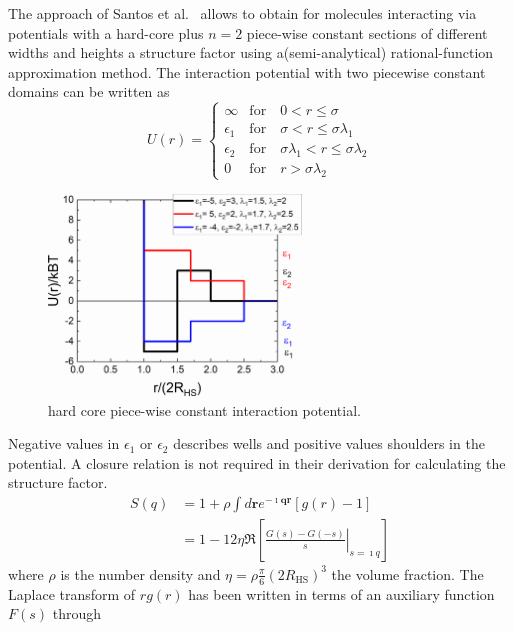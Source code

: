 The approach of Santos et al.\ \cite{Santos_2012,Santos_2013} allows to obtain for molecules interacting via potentials with a hard-core plus $n=2$ piece-wise constant sections of different widths and heights a structure factor using a(semi-analytical) rational-function approximation method. The interaction potential with two piecewise constant domains can be written as
\begin{equation}
U(r) =
 \begin{cases}
      \infty    & \text{for} \quad 0<r\leq\sigma \\
      \epsilon_1 & \text{for} \quad \sigma<r\leq\sigma\lambda_1 \\
      \epsilon_2 & \text{for} \quad \sigma\lambda_1<r\leq\sigma\lambda_2 \\
      0         & \text{for} \quad r>\sigma\lambda_2
   \end{cases}
\end{equation}
\begin{figure}[htb]
\begin{center}
\includegraphics[width=0.6\textwidth]{../images/structure_factor/piecewise_constant_HS/piecewise_constant_2.png}
\end{center}
\caption{hard core piece-wise constant interaction potential.}
\label{fig:Upiecewiseconstant}
\end{figure}
Negative values in $\epsilon_1$ or $\epsilon_2$ describes wells and positive values shoulders in the potential. A closure relation is not required in their derivation for calculating the structure factor.
\begin{align}
  S(q) &= 1+ \rho\int d\mathbf{r} e^{-\imath \mathbf{qr}}\left[g(r)-1\right] \\
       &= 1 - 12\eta\Re\left[\left.\frac{G(s)-G(-s)}{s}\right|_{s=\imath q}\right]
\end{align}
where $\rho$ is the number density and $\eta=\rho \frac{\pi}{6} (2R_\mathrm{HS})^3$ the volume fraction. The Laplace transform of $rg(r)$ has been written in terms of an auxiliary function $F(s)$ through
